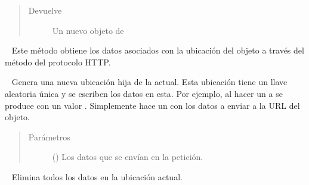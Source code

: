 \begin{fulllineitems}
\begin{fulllineitems}
\begin{quote}
\begin{description}
\item[{Devuelve}] \leavevmode
Un nuevo objeto de 

\end{description}\end{quote}

\end{fulllineitems}


\begin{fulllineitems}
\label{\detokenize{nao_firebase:firebase.FirebaseDatabase.get}}~
Este método obtiene los datos asociados con la ubicación del objeto a través
del método  del protocolo HTTP.

\end{fulllineitems}


\begin{fulllineitems}
\label{\detokenize{nao_firebase:firebase.FirebaseDatabase.push}}~
Genera una nueva ubicación hija de la actual. Esta ubicación tiene un
llave aleatoria única y se escriben los datos en esta.
Por ejemplo, al hacer un  a 
se produce  con un valor .
Simplemente hace un  con los datos a enviar  a la URL del objeto.
\begin{quote}\begin{description}
\item[{Parámetros}] \leavevmode
{} () \textendash{} Los datos que se envían en la petición.

\end{description}\end{quote}

\end{fulllineitems}


\begin{fulllineitems}
\label{\detokenize{nao_firebase:firebase.FirebaseDatabase.remove}}~
Elimina todos los datos en la ubicación actual.


\end{fulllineitems}
\end{fulllineitems}
